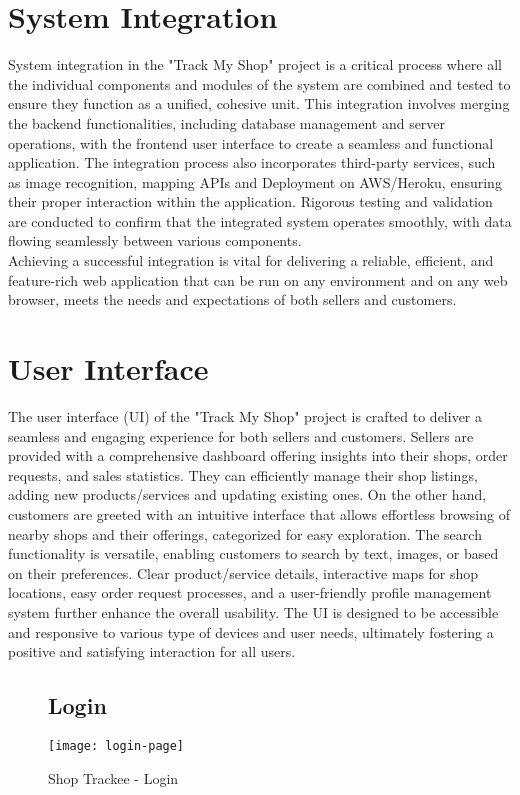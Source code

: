 \section{System Integration}
System integration in the "Track My Shop" project is a critical process where all the individual components and modules of the system are combined and tested to ensure they function as a unified, cohesive unit. This integration involves merging the backend functionalities, including database management and server operations, with the frontend user interface to create a seamless and functional application. The integration process also incorporates third-party services, such as image recognition, mapping APIs and Deployment on AWS/Heroku, ensuring their proper interaction within the application. Rigorous testing and validation are conducted to confirm that the integrated system operates smoothly, with data flowing seamlessly between various components.\\
Achieving a successful integration is vital for delivering a reliable, efficient, and feature-rich web application that can be run on any environment and on any web browser, meets the needs and expectations of both sellers and customers. 

\section{User Interface}
The user interface (UI) of the "Track My Shop" project is crafted to deliver a seamless and engaging experience for both sellers and customers. Sellers are provided with a comprehensive dashboard offering insights into their shops, order requests, and sales statistics. They can efficiently manage their shop listings, adding new products/services and updating existing ones. On the other hand, customers are greeted with an intuitive interface that allows effortless browsing of nearby shops and their offerings, categorized for easy exploration. The search functionality is versatile, enabling customers to search by text, images, or based on their preferences. Clear product/service details, interactive maps for shop locations, easy order request processes, and a user-friendly profile management system further enhance the overall usability. The UI is designed to be accessible and responsive to various type of devices and user needs, ultimately fostering a positive and satisfying interaction for all users.
\newpage

\begin{figure}[h]
	\subsection{Login}
	\centering
	\texttt{[image: login-page]}
	\caption{Shop Trackee - Login}
\end{figure}

